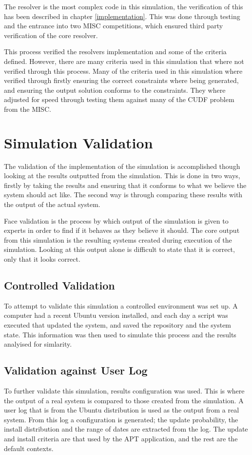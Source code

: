 The resolver is the most complex code in this simulation, the verification of this has been described in chapter \ref{implementation}.
This was done through testing and the entrance into two MISC competitions, which ensured third party verification of the core resolver.

This process verified the resolvers implementation and some of the criteria defined.
However, there are many criteria used in this simulation that where not verified through this process.
Many of the criteria used in this simulation where verified through firstly ensuring the correct constraints where being generated, 
and ensuring the output solution conforms to the constraints.
They where adjusted for speed through testing them against many of the CUDF problem from the MISC.

\section{Simulation Validation}
The validation of the implementation of the simulation is accomplished though looking at the results outputted from the simulation.
This is done in two ways, firstly by taking the results and ensuring that it conforms to what we believe the system should act like.
The second way is through comparing these results with the output of the actual system.

Face validation is the process by which output of the simulation is given to experts in order to find if it behaves as they believe it should.
The core output from this simulation is the resulting systems created during execution of the simulation.
Looking at this output alone is difficult to state that it is correct, only that it looks correct.

\subsection{Controlled Validation}
To attempt to validate this simulation a controlled environment was set up. 
A computer had a recent Ubuntu version installed, and each day a script was executed that updated the system, and saved the repository and the system state.
This information was then used to simulate this process and the results analyised for simlarity.

\subsection{Validation against User Log}
To further validate this simulation, results configuration was used.
This is where the output of a real system is compared to those created from the simulation.
A user log that is from the Ubuntu distribution is used as the output from a real system. 
From this log a configuration is generated; the update probability, the install distribution and the range of dates are extracted from the log.
The update and install criteria are that used by the APT application, and the rest are the default contexts.  

